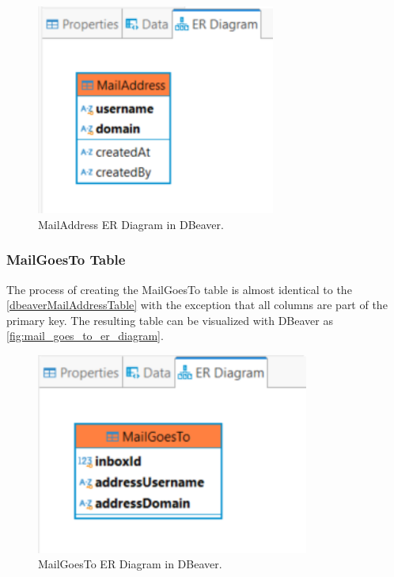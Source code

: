 \documentclass[a4paper,11pt,oneside]{article}
\begin{document}
\begin{sloppypar}
\begin{figure}[!htb]
  \centering
  \includegraphics[width=0.7\textwidth]{dbeaver/mail_address_er_diagram.png}
  \caption{MailAddress ER Diagram in DBeaver.}
  \label{fig:mail_address_er_diagram}
\end{figure}

\subsubsection{MailGoesTo Table}
\label{dbeaverMailGoesToTable}
The process of creating the MailGoesTo table is almost identical to the \autoref{dbeaverMailAddressTable} with the exception that all columns are part of the primary key. The resulting table can be visualized with DBeaver as \autoref{fig:mail_goes_to_er_diagram}.

\begin{figure}[!htb]
  \centering
  \includegraphics[width=0.8\textwidth]{dbeaver/mail_goes_to_er_diagram.png}
  \caption{MailGoesTo ER Diagram in DBeaver.}
  \label{fig:mail_goes_to_er_diagram}
\end{figure}




\end{sloppypar}
\end{document}
